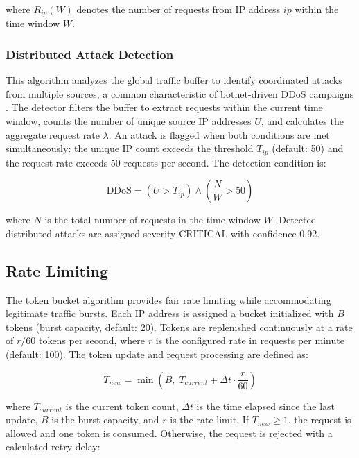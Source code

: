 \documentclass[conference]{IEEEtran}
\begin{document}
where $R_{ip}(W)$ denotes the number of requests from IP address $ip$ within the time window $W$.

\subsubsection{Distributed Attack Detection}
This algorithm analyzes the global traffic buffer to identify coordinated attacks from multiple sources, a common characteristic of botnet-driven DDoS campaigns \cite{b10}. The detector filters the buffer to extract requests within the current time window, counts the number of unique source IP addresses $U$, and calculates the aggregate request rate $\lambda$. An attack is flagged when both conditions are met simultaneously: the unique IP count exceeds the threshold $T_{ip}$ (default: 50) and the request rate exceeds 50 requests per second. The detection condition is:

\begin{equation}
\text{DDoS} = (U > T_{ip}) \wedge \left(\frac{N}{W} > 50\right)
\label{eq_ddos}
\end{equation}

where $N$ is the total number of requests in the time window $W$. Detected distributed attacks are assigned severity CRITICAL with confidence 0.92.

\subsection{Rate Limiting}

The token bucket algorithm \cite{b8} provides fair rate limiting while accommodating legitimate traffic bursts. Each IP address is assigned a bucket initialized with $B$ tokens (burst capacity, default: 20). Tokens are replenished continuously at a rate of $r/60$ tokens per second, where $r$ is the configured rate in requests per minute (default: 100). The token update and request processing are defined as:

\begin{equation}
T_{new} = \min\left(B, \; T_{current} + \Delta t \cdot \frac{r}{60}\right)
\label{eq_token}
\end{equation}

where $T_{current}$ is the current token count, $\Delta t$ is the time elapsed since the last update, $B$ is the burst capacity, and $r$ is the rate limit. If $T_{new} \geq 1$, the request is allowed and one token is consumed. Otherwise, the request is rejected with a calculated retry delay:
\end{document}
